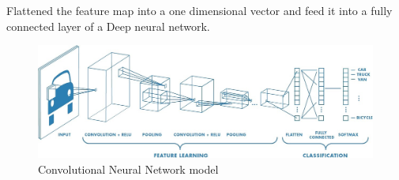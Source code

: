     Flattened the feature map into a one dimensional vector and feed it into a fully connected layer of a Deep neural network.
    \vspace{9mm}
    \begin{figure}[h]
        \centering
        \includegraphics[width=0.9\linewidth]{cnn.png}
        \caption{Convolutional Neural Network model}
        \label{fig:Convolutional Neural Network model}
    \end{figure} 
